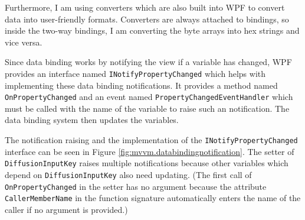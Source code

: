 Furthermore, I am using converters which are also built into WPF to convert data into user-friendly formats. Converters are always attached to bindings, so inside the two-way bindings, I am converting the byte arrays into hex strings and vice versa.

Since data binding works by notifying the view if a variable has changed, WPF provides an interface named \texttt{INotifyPropertyChanged} which helps with implementing these data binding notifications. It provides a method named \texttt{OnPropertyChanged} and  an event named \texttt{PropertyChangedEventHandler} which must be called with the name of the variable to raise such an notification. The data binding system then updates the variables.

The notification raising and the implementation of the \texttt{INotifyPropertyChanged} interface can be seen in Figure \ref{fig:mvvm.databindingnotification}. The setter of \texttt{DiffusionInputKey} raises multiple notifications because other variables which depend on \texttt{DiffusionInputKey} also need updating. (The first call of \texttt{OnPropertyChanged}  in the setter has no argument because the attribute \texttt{CallerMemberName} in the function signature automatically enters the name of the caller if no argument is provided.)


